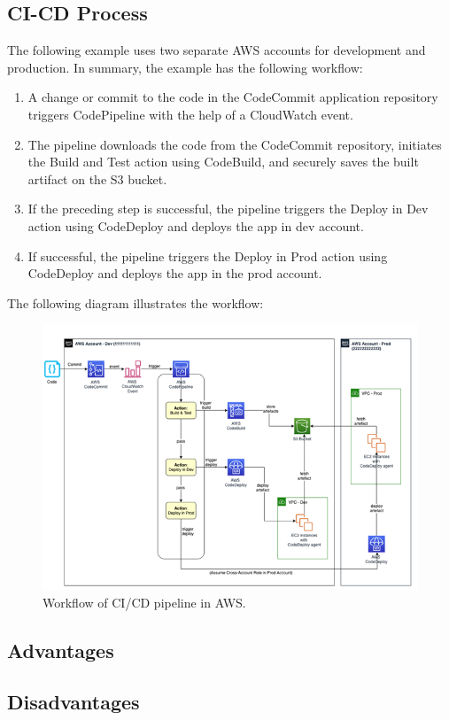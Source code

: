 %
\subsection{CI-CD Process}
%
The following example uses two separate AWS accounts for development and production.
In summary, the example has the following workflow:

\begin{enumerate}
    \item A change or commit to the code in the CodeCommit application repository triggers CodePipeline with the help of a CloudWatch event.
    
    \item The pipeline downloads the code from the CodeCommit repository, initiates the Build and Test action using CodeBuild, and securely saves the built artifact on the S3 bucket.
    
    \item If the preceding step is successful, the pipeline triggers the Deploy in Dev action using CodeDeploy and deploys the app in dev account.
    
    \item If successful, the pipeline triggers the Deploy in Prod action using CodeDeploy and deploys the app in the prod account.
\end{enumerate}

The following diagram illustrates the workflow:

\begin{figure}[h]
    \centering
    \includegraphics[width=\textwidth]{images/aws_cicd.png}
    \caption{Workflow of CI/CD pipeline in AWS.}
    \label{fig:aws_cicd}
\end{figure}



%
\subsection{Advantages}
%
\subsection{Disadvantages}
